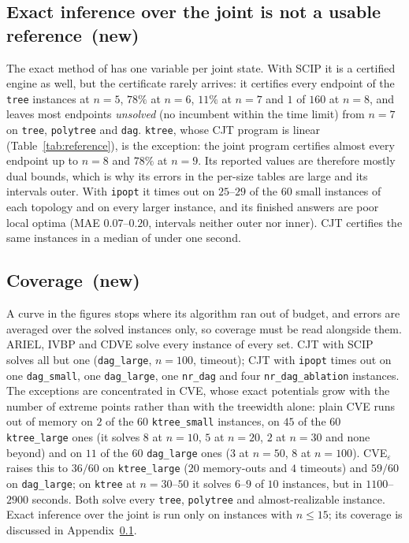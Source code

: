 \documentclass{article} %
\DeclareRobustCommand{\rev}[1]{{\color{blue}#1}}
\newcommand{\newtag}{\texorpdfstring{~\rev{(new)}}{}}
\begin{document}


\subsection{Exact inference over the joint is not a usable reference\newtag}
\label{sec-exact-baseline}

The exact method of \citet{marinescu2022neurips} has one variable per joint state. With SCIP it is a certified engine as well, but the certificate rarely arrives: it certifies every endpoint of the \texttt{tree} instances at $n=5$, $78\%$ at $n=6$, $11\%$ at $n=7$ and $1$ of $160$ at $n=8$, and leaves most endpoints \emph{unsolved} (no incumbent within the time limit) from $n=7$ on \texttt{tree}, \texttt{polytree} and \texttt{dag}. \texttt{ktree}, whose CJT program is linear (Table~\ref{tab:reference}), is the exception: the joint program certifies almost every endpoint up to $n=8$ and $78\%$ at $n=9$. Its reported values are therefore mostly dual bounds, which is why its errors in the per-size tables are large and its intervals outer. With \texttt{ipopt} it times out on $25$--$29$ of the $60$ small instances of each topology and on every larger instance, and its finished answers are poor local optima (MAE $0.07$--$0.20$, intervals neither outer nor inner). CJT certifies the same instances in a median of under one second.

\subsection{Coverage\newtag}
\label{sec-coverage}

A curve in the figures stops where its algorithm ran out of budget, and errors are averaged over the solved instances only, so coverage must be read alongside them. ARIEL, IVBP and CDVE solve every instance of every set. CJT with SCIP solves all but one (\texttt{dag\_large}, $n=100$, timeout); CJT with \texttt{ipopt} times out on one \texttt{dag\_small}, one \texttt{dag\_large}, one \texttt{nr\_dag} and four \texttt{nr\_dag\_ablation} instances. The exceptions are concentrated in CVE, whose exact potentials grow with the number of extreme points rather than with the treewidth alone: plain CVE runs out of memory on $2$ of the $60$ \texttt{ktree\_small} instances, on $45$ of the $60$ \texttt{ktree\_large} ones (it solves $8$ at $n=10$, $5$ at $n=20$, $2$ at $n=30$ and none beyond) and on $11$ of the $60$ \texttt{dag\_large} ones ($3$ at $n=50$, $8$ at $n=100$). CVE$_\varepsilon$ raises this to $36/60$ on \texttt{ktree\_large} ($20$ memory-outs and $4$ timeouts) and $59/60$ on \texttt{dag\_large}; on \texttt{ktree} at $n=30$--$50$ it solves $6$--$9$ of $10$ instances, but in $1100$--$2900$ seconds. Both solve every \texttt{tree}, \texttt{polytree} and almost-realizable instance. Exact inference over the joint is run only on instances with $n\le 15$; its coverage is discussed in Appendix~\ref{sec-exact-baseline}.
\end{document}

